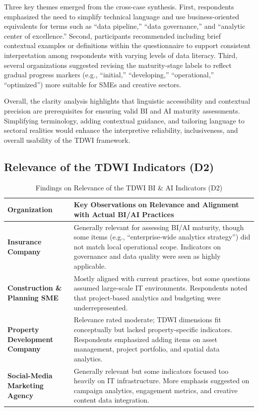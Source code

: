 \documentclass[conference]{IEEEtran}
\begin{document}
Three key themes emerged from the cross-case synthesis. First, respondents emphasized the need to simplify technical language and use business-oriented equivalents for terms such as “data pipeline,” “data governance,” and “analytic center of excellence.” Second, participants recommended including brief contextual examples or definitions within the questionnaire to support consistent interpretation among respondents with varying levels of data literacy. Third, several organizations suggested revising the maturity-stage labels to reflect gradual progress markers (e.g., “initial,” “developing,” “operational,” “optimized”) more suitable for SMEs and creative sectors.

Overall, the clarity analysis highlights that linguistic accessibility and contextual precision are prerequisites for ensuring valid BI and AI maturity assessments. Simplifying terminology, adding contextual guidance, and tailoring language to sectoral realities would enhance the interpretive reliability, inclusiveness, and overall usability of the TDWI framework.

\subsection{Relevance of the TDWI Indicators (D2)}
\label{sec:relevance_results}

\begin{table}[h!]
\centering
\caption{Findings on Relevance of the TDWI BI \& AI Indicators (D2)}
\label{tab:d2_relevance}
\renewcommand{\arraystretch}{1.2}
\begin{tabular}{p{.16\linewidth} p{.74\linewidth}}
\hline
\textbf{Organization} & \textbf{Key Observations on Relevance and Alignment with Actual BI/AI Practices} \\ \hline

\textbf{Insurance Company} & 
Generally relevant for assessing BI/AI maturity, though some items (e.g., “enterprise-wide analytics strategy”) did not match local operational scope.  
Indicators on governance and data quality were seen as highly applicable.  \\ \hline

\textbf{Construction \& Planning SME} & 
Mostly aligned with current practices, but some questions assumed large-scale IT environments.  
Respondents noted that project-based analytics and budgeting were underrepresented. \\ \hline

\textbf{Property Development Company} & 
Relevance rated moderate; TDWI dimensions fit conceptually but lacked property-specific indicators.  
Respondents emphasized adding items on asset management, project portfolio, and spatial data analytics.  \\ \hline

\textbf{Social-Media Marketing Agency} & 
Generally relevant but some indicators focused too heavily on IT infrastructure.  
More emphasis suggested on campaign analytics, engagement metrics, and creative content data integration.  \\ \hline
\end{tabular}
\end{table}
\end{document}
